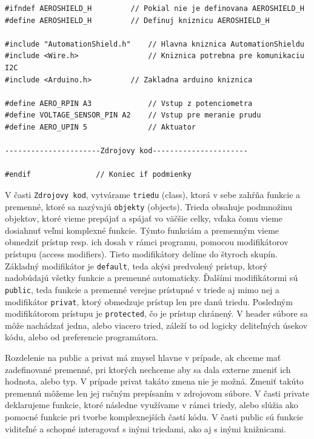 \begin{lstlisting}[caption={Ukážka zdrojového kódu headeru.},captionpos=b]
#ifndef AEROSHIELD_H	 	 // Pokial nie je definovana AEROSHIELD_H
#define AEROSHIELD_H	 	 // Definuj kniznicu AEROSHIELD_H

#include "AutomationShield.h"    // Hlavna kniznica AutomationShieldu
#include <Wire.h>                // Kniznica potrebna pre komunikaciu I2C
#include <Arduino.h>		 // Zakladna arduino kniznica

#define AERO_RPIN A3             // Vstup z potenciometra
#define VOLTAGE_SENSOR_PIN A2    // Vstup pre meranie prudu 
#define AERO_UPIN 5              // Aktuator

----------------------Zdrojovy kod----------------------

#endif			   	 // Koniec if podmienky 
\end{lstlisting}



V časti \verb|Zdrojovy kod|, vytvárame \verb|triedu| (class), ktorá v sebe zahŕňa funkcie a premenné, ktoré sa nazývajú \verb|objekty| (objects). Trieda obsahuje podmnožinu objektov, ktoré vieme prepájať a spájať vo väčšie celky, vďaka čomu vieme dosiahnuť veľmi komplexné funkcie. Týmto funkciám a premenným vieme obmedziť prístup resp. ich dosah v rámci programu, pomocou modifikátorov prístupu (access modifiers). Tieto modifikátory delíme do štyroch skupín. Základný modifikátor je \verb|default|, teda akýsi predvolený prístup, ktorý nadobúdajú všetky funkcie a premenné automaticky. Ďalšími modifikátormi sú \verb|public|, teda funkcie a premenné verejne prístupné v triede aj mimo nej a modifikátor \verb|privat|, ktorý obmedzuje prístup len pre danú triedu. Posledným modifikátorom prístupu je \verb|protected|, čo je prístup chránený. V header súbore sa môže nachádzať jedna, alebo viacero tried, záleží to od logicky deliteľných úsekov kódu, alebo od preferencie programátora. 

Rozdelenie na public a privat má zmysel hlavne v prípade, ak chceme mať zadefinované premenné, pri ktorých nechceme aby sa dala externe zmeniť ich hodnota, alebo typ. V prípade privat takáto zmena nie je možná. Zmeniť takúto premennú môžeme len jej ručným prepísaním v zdrojovom súbore. V časti private deklarujeme funkcie, ktoré následne využívame v rámci triedy, alebo slúžia ako pomocné funkcie pri tvorbe komplexnejších častí kódu. V časti public sú funkcie viditeľné a schopné interagovať s inými triedami, ako aj s inými knižnicami. 


